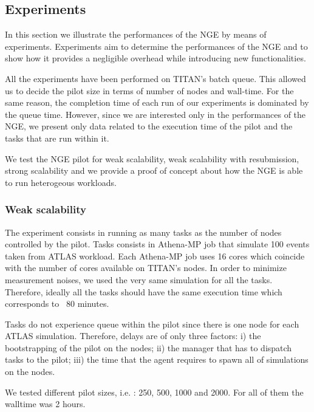 
\subsection{Experiments}

In this section we illustrate the performances of the NGE by means of experiments.
Experiments aim to determine the performances of the NGE and to show how it provides a negligible overhead while introducing new functionalities.

All the experiments have been performed on TITAN's batch queue. This allowed us to decide the pilot size in terms of number of nodes and wall-time. For the same reason, the completion time of each run of our experiments is dominated by the queue time. However, since we are interested only in the performances of the NGE, we present only data related to the execution time of the pilot and the tasks that are run within it.

We test the NGE pilot for weak scalability, weak scalability with resubmission, strong scalability and we provide a proof of concept about how the NGE is able to run heterogeous workloads.


\subsubsection{Weak scalability}
The experiment consists in running as many tasks as the number of nodes controlled by the pilot.
Tasks consists in Athena-MP job that simulate 100 events taken from ATLAS workload.
Each Athena-MP job uses 16 cores which coincide with the number of cores available on TITAN's nodes.
In order to minimize measurement noises, we used the very same simulation for all the tasks. Therefore, ideally all the tasks should have the same execution time which corresponds to ~$80$ minutes. 
 
Tasks do not experience queue within the pilot since there is one node for each ATLAS simulation. Therefore, delays are of only three factors: i) the bootstrapping of the pilot on the nodes; ii) the manager that has to dispatch tasks to the pilot; iii) the time that the agent requires to spawn all of simulations on the nodes.

We tested different pilot sizes, i.e. : 250, 500, 1000 and 2000. For all of them the walltime was 2 hours.

